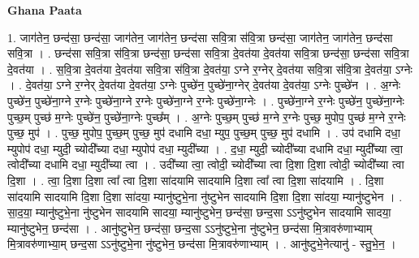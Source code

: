 \documentclass[17pt]{extarticle}
\begin{document}
\textbf{Ghana Paata } \newline

1. जाग॑तेन॒ छन्द॑सा॒ छन्द॑सा॒ जाग॑तेन॒ जाग॑तेन॒ छन्द॑सा सवि॒त्रा स॑वि॒त्रा छन्द॑सा॒ जाग॑तेन॒ जाग॑तेन॒ छन्द॑सा सवि॒त्रा । . छन्द॑सा सवि॒त्रा स॑वि॒त्रा छन्द॑सा॒ छन्द॑सा सवि॒त्रा दे॒वत॑या दे॒वत॑या सवि॒त्रा छन्द॑सा॒ छन्द॑सा सवि॒त्रा दे॒वत॑या । . स॒वि॒त्रा दे॒वत॑या दे॒वत॑या सवि॒त्रा स॑वि॒त्रा दे॒वत॑या॒ ऽग्ने र॒ग्नेर् दे॒वत॑या सवि॒त्रा स॑वि॒त्रा दे॒वत॑या॒ ऽग्नेः । . दे॒वत॑या॒ ऽग्ने र॒ग्नेर् दे॒वत॑या दे॒वत॑या॒ ऽग्नेः पुच्छे॑न॒ पुच्छे॑ना॒ग्नेर् दे॒वत॑या दे॒वत॑या॒ ऽग्नेः पुच्छे॑न । . अ॒ग्नेः पुच्छे॑न॒ पुच्छे॑ना॒ग्ने र॒ग्नेः पुच्छे॑ना॒ग्ने र॒ग्नेः पुच्छे॑ना॒ग्ने र॒ग्नेः पुच्छे॑ना॒ग्नेः । . पुच्छे॑ना॒ग्ने र॒ग्नेः पुच्छे॑न॒ पुच्छे॑ना॒ग्नेः पुच्छ॒म् पुच्छ॑ म॒ग्नेः पुच्छे॑न॒ पुच्छे॑ना॒ग्नेः पुच्छ᳚म् । . अ॒ग्नेः पुच्छ॒म् पुच्छ॑ म॒ग्ने र॒ग्नेः पुच्छ॒ मुपोप॒ पुच्छ॑ म॒ग्ने र॒ग्नेः पुच्छ॒ मुप॑ । . पुच्छ॒ मुपोप॒ पुच्छ॒म् पुच्छ॒ मुप॑ दधामि दधा॒ म्युप॒ पुच्छ॒म् पुच्छ॒ मुप॑ दधामि । . उप॑ दधामि दधा॒ म्युपोप॑ दधा॒ म्युदी॒ च्योदी᳚च्या दधा॒ म्युपोप॑ दधा॒ म्युदी᳚च्या । . द॒धा॒ म्युदी॒ च्योदी᳚च्या दधामि दधा॒ म्युदी᳚च्या त्वा॒ त्वोदी᳚च्या दधामि दधा॒ म्युदी᳚च्या त्वा । . उदी᳚च्या त्वा॒ त्वोदी॒ च्योदी᳚च्या त्वा दि॒शा दि॒शा त्वोदी॒ च्योदी᳚च्या त्वा दि॒शा । . त्वा॒ दि॒शा दि॒शा त्वा᳚ त्वा दि॒शा सा॑दयामि सादयामि दि॒शा त्वा᳚ त्वा दि॒शा सा॑दयामि । . दि॒शा सा॑दयामि सादयामि दि॒शा दि॒शा सा॑दया॒ म्यानु॑ष्टुभे॒ना नु॑ष्टुभेन सादयामि दि॒शा दि॒शा सा॑दया॒
म्यानु॑ष्टुभेन । . सा॒द॒या॒ म्यानु॑ष्टुभे॒ना नु॑ष्टुभेन सादयामि सादया॒ म्यानु॑ष्टुभेन॒ छन्द॑सा॒ छन्द॒सा ऽऽनु॑ष्टुभेन सादयामि सादया॒ म्यानु॑ष्टुभेन॒ छन्द॑सा । . आनु॑ष्टुभेन॒ छन्द॑सा॒ छन्द॒सा ऽऽनु॑ष्टुभे॒ना नु॑ष्टुभेन॒ छन्द॑सा मि॒त्रावरु॑णाभ्याम् मि॒त्रावरु॑णाभ्या॒म् छन्द॒सा ऽऽनु॑ष्टुभे॒ना नु॑ष्टुभेन॒ छन्द॑सा मि॒त्रावरु॑णाभ्याम् । . आनु॑ष्टुभे॒नेत्यानु॑ - स्तु॒भे॒न॒ । \newline
\end{document}
